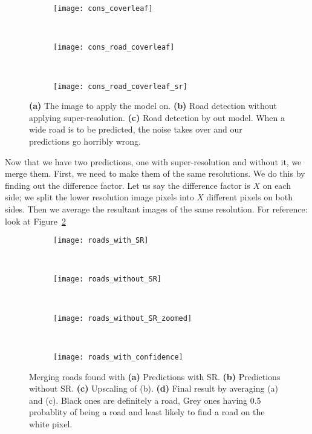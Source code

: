 \begin{figure}[h!]
  \centering
  \begin{subfigure}{0.3\textwidth}
    \texttt{[image: cons\_coverleaf]}
    \caption{}
  \end{subfigure}~
  \begin{subfigure}{0.3\textwidth}
    \texttt{[image: cons\_road\_coverleaf]}
    \caption{}
  \end{subfigure}~
  \begin{subfigure}{0.3\textwidth}
    \texttt{[image: cons\_road\_coverleaf\_sr]}
    \caption{}
  \end{subfigure}
  \caption[Problem in predictions large roads]{\textbf{(a)} The image to apply the model on. \textbf{(b)} Road detection without applying super-resolution. \textbf{(c)} Road detection by out model. When a wide road is to be predicted, the noise takes over and our predictions go horribly wrong.}
  \label{fig:cons_coverleaf}
\end{figure}


Now that we have two predictions, one with super-resolution and without it, we merge them. First, we need to make them of the same resolutions. We do this by finding out the difference factor. Let us say the difference factor is $X$ on each side; we split the lower resolution image pixels into $X$ different pixels on both sides. Then we average the resultant images of the same resolution. For reference: look at Figure~\ref{fig:roads_in_confidence}

\begin{figure}[h!]
  \begin{subfigure}[b]{0.25\textwidth}
    \texttt{[image: roads\_with\_SR]}
    \caption{}
  \end{subfigure}~
  \begin{subfigure}[b]{0.15\textwidth}
    \texttt{[image: roads\_without\_SR]}
    \caption{}
  \end{subfigure}~
  \begin{subfigure}[b]{0.25\textwidth}
    \texttt{[image: roads\_without\_SR\_zoomed]}
    \caption{}
  \end{subfigure}~
  \begin{subfigure}[b]{0.25\textwidth}
    \texttt{[image: roads\_with\_confidence]}
    \caption{}
  \end{subfigure}
  \caption[Finding likelihood of roads in predictions]{Merging roads found with \textbf{(a)} Predictions with SR. \textbf{(b)} Predictions without SR. \textbf{(c)} Upscaling of (b). \textbf{(d)} Final result by averaging (a) and (c). Black ones are definitely a road, Grey ones having 0.5 probablity of being a road and  least likely to find a road on the white pixel.}
  \label{fig:roads_in_confidence}
\end{figure}

